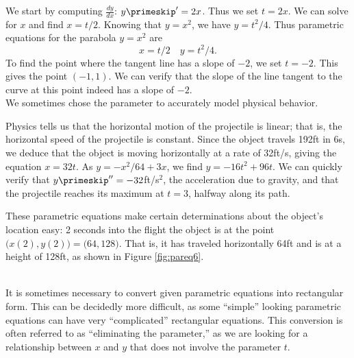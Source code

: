 {We start by computing $\frac{dy}{dx}$: $y\primeskip' = 2x$. Thus we set $t=2x$. We can solve for $x$ and find $x= t/2$. Knowing that $y=x^2$, we have $y= t^2/4$. Thus parametric equations for the parabola $y=x^2$ are $$x=t/2 \quad y=t^2/4.$$
To find the point where the tangent line has a slope of $-2$, we set $t=-2$. This gives the point $(-1, 1)$. We can verify that the slope of the line tangent to the curve at this point indeed has a slope of $-2$.
}\\

We sometimes chose the parameter to accurately model physical behavior.\\

{Physics tells us that the horizontal motion of the projectile is linear; that is, the horizontal speed of the projectile is constant. Since the object travels 192ft in 6s, we deduce that the object is moving horizontally at a rate of 32ft/s, giving the equation $x=32t$. As $y=-x^2/64+3x$, we find $y= -16t^2+96t$. We can quickly verify that $y\primeskip''=-32$ft/s$^2$, the acceleration due to gravity, and that the projectile reaches its maximum at $t=3$, halfway along its path.

These parametric equations make certain determinations about the object's location easy: 2 seconds into the flight the object is at the point $\big(x(2),y(2)\big) = \big(64,128\big)$. That is, it has traveled horizontally 64ft and is at a height of 128ft, as shown in Figure \ref{fig:pareq6}.
}\\

It is  sometimes necessary to convert given parametric equations into rectangular form. This can be decidedly more difficult, as some ``simple'' looking parametric equations can have very ``complicated'' rectangular equations. This conversion is often referred to as ``eliminating the parameter,'' as we are looking for a relationship between $x$ and $y$ that does not involve the parameter $t$.\\

